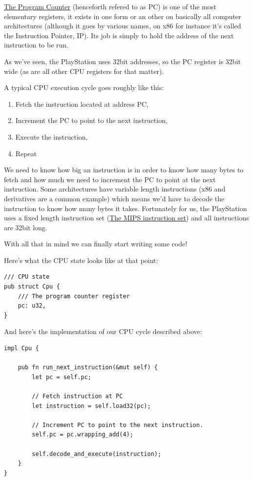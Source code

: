 \documentclass[a4paper]{article}
\begin{document}
\href{https://en.wikipedia.org/wiki/Program_counter}{The Program
  Counter} (henceforth refered to as PC) is one of the most
elementary registers, it exists in one form or an other on basically
all computer architectures (although it goes by various names, on x86
for instance it's called the Instruction Pointer, IP). Its
job is simply to hold the address of the next instruction to be run.

As we've seen, the PlayStation uses 32bit addresses, so the PC
register is 32bit wide (as are all other CPU registers for that
matter).

A typical CPU execution cycle goes roughly like this:

\begin{enumerate}
  \item Fetch the instruction located at address PC,
  \item Increment the PC to point to the next instruction,
  \item Execute the instruction,
  \item Repeat
\end{enumerate}

We need to know how big an instruction is in order to know how many
bytes to fetch and how much we need to increment the PC to
point at the next instruction. Some architectures have variable length
instructions (x86 and derivatives are a common example) which means
we'd have to decode the instruction to know how many bytes it
takes. Fortunately for us, the PlayStation uses a fixed length
instruction set
(\href{https://en.wikipedia.org/wiki/MIPS_instruction_set}{The MIPS
  instruction set}) and all instructions are 32bit long.

With all that in mind we can finally start writing some code!

Here's what the CPU state looks like at that point:

\begin{lstlisting}
/// CPU state
pub struct Cpu {
    /// The program counter register
    pc: u32,
}
\end{lstlisting}

And here's the implementation of our CPU cycle described above:

\begin{lstlisting}
impl Cpu {

    pub fn run_next_instruction(&mut self) {
        let pc = self.pc;

        // Fetch instruction at PC
        let instruction = self.load32(pc);

        // Increment PC to point to the next instruction.
        self.pc = pc.wrapping_add(4);

        self.decode_and_execute(instruction);
    }
}
\end{lstlisting}
\end{document}
